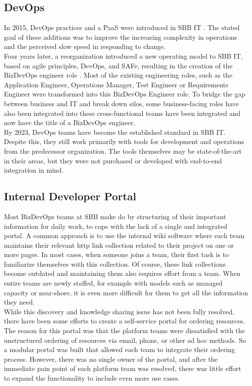 \documentclass[a4paper,10pt]{article}
\begin{document}
    \subsection{DevOps}
    \label{subsec:sbbdevops}
    In 2015, DevOps practices and a PaaS were introduced in SBB IT .
    The stated goal of these additions was to improve the increasing complexity in operations and the perceived slow
    speed in responding to change\parencite{sbbdevops}.\\
    Four years later, a reorganization introduced a new operating model to SBB IT, based on agile principles, DevOps,
    and SAFe, resulting in the creation of the BizDevOps engineer role\parencite{sbbagile} .
    Most of the existing engineering roles, such as the Application Engineer, Operations Manager, Test Engineer or
    Requirements Engineer were transformed into this BizDevOps Engineer role.
    To bridge the gap between business and IT and break down silos, some business-facing roles have also been integrated into these
    cross-functional teams have been integrated and now have the title of a BizDevOps engineer.\\
    By 2023, DevOps teams have become the established standard in SBB IT.
    Despite this, they still work primarily with tools for development and operations from the predecessor organization.
    The tools themselves may be state-of-the-art in their areas, but they were not purchased or developed with
    end-to-end integration in mind.

    \subsection{Internal Developer Portal}
    \label{subsec:sbbportal}
    Most BizDevOps teams at SBB make do by structuring of their important information for daily work, to cope
    with the lack of a single and integrated portal.
    A common approach is to use the internal wiki software where each team maintains their relevant http link collection
    related to their project on one or more pages.
    In most cases, when someone joins a team, their first task is to familiarize themselves with this collection.
    Of course, these link collections become outdated and maintaining them also requires effort from a team.
    When entire teams are newly staffed, for example with models such as managed capacity or near-shore, it is even more
    difficult for them to get all the information they need.\\
    While this discovery and knowledge sharing issue has not been fully resolved, there have been some efforts to create
    a self-service portal for ordering resources.
    The reason for this portal was that the platform teams were dissatisfied with the unstructured ordering of resources
    via email, phone, or other ad hoc methods.
    So a modular portal was built that allowed each team to integrate their ordering process.
    However, there was no single owner of the portal, and after the immediate pain point of each platform team was
    resolved, there was little effort to expand the functionality to include even more use cases.
\end{document}
